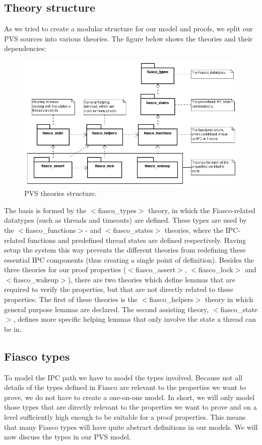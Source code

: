 \subsection{Theory structure}
As we tried to create a modular structure for our model and proofs, we split our PVS sources into various theories. The figure below shows the theories and their dependencies:

\begin{figure}[ht]
\includegraphics[scale=0.50]{images/diagrams/ipc_class_theories}
\caption{PVS theories structure.}
\end{figure}

The basis is formed by the $<$fiasco\_types$>$ theory, in which the Fiasco-related datatypes (such as threads and timeouts) are defined. These types are used by the $<$fiasco\_functions$>$- and $<$fiasco\_states$>$ theories, where the IPC-related functions and predefined thread states are defined respectively. Having setup the system this way prevents the different theories from redefining these essential IPC components (thus creating a single point of definition). Besides the three theories for our proof properties ($<$fiasco\_assert$>$, $<$fiasco\_lock$>$ and $<$fiasco\_wakeup$>$), there are two theories which define lemmas that are required to verify the properties, but that are not directly related to these properties. The first of these theories is the $<$fiasco\_helpers$>$ theory in which general purpose lemmas are declared. The second assisting theory, $<$fiasco\_state$>$, defines more specific helping lemmas that only involve the state a thread can be in.

\subsection{Fiasco types}
To model the IPC path we have to model the types involved. Because not all details of the types defined in Fiasco are relevant to the properties we want to prove, we do not have to create a one-on-one model. In short, we will only model those types that are directly relevant to the properties we want to prove and on a level sufficiently high enough to be suitable for a proof properties. This means that many Fiasco types will have quite abstract definitions in our models. We will now discuss the types in our PVS model.

